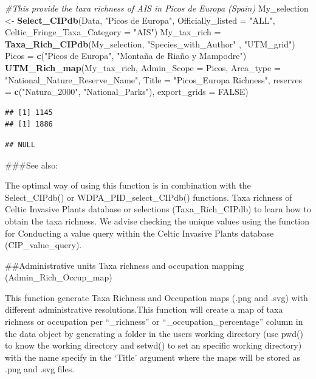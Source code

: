 \documentclass[
]{article}
\newenvironment{Shaded}{\begin{snugshade}}{\end{snugshade}}
\newcommand{\AttributeTok}[1]{\textcolor[rgb]{0.13,0.29,0.53}{#1}}
\newcommand{\CommentTok}[1]{\textcolor[rgb]{0.56,0.35,0.01}{\textit{#1}}}
\newcommand{\ConstantTok}[1]{\textcolor[rgb]{0.56,0.35,0.01}{#1}}
\newcommand{\FunctionTok}[1]{\textcolor[rgb]{0.13,0.29,0.53}{\textbf{#1}}}
\newcommand{\NormalTok}[1]{#1}
\newcommand{\OtherTok}[1]{\textcolor[rgb]{0.56,0.35,0.01}{#1}}
\newcommand{\StringTok}[1]{\textcolor[rgb]{0.31,0.60,0.02}{#1}}
\begin{document}
\begin{Shaded}
\begin{Highlighting}[]
\CommentTok{\#This provide the taxa richness of AIS in Picos de Europa (Spain)}
\NormalTok{My\_selection }\OtherTok{\textless{}{-}} \FunctionTok{Select\_CIPdb}\NormalTok{(Data, }\StringTok{"Picos de Europa"}\NormalTok{, }\AttributeTok{Officially\_listed =} \StringTok{"ALL"}\NormalTok{,}
\AttributeTok{Celtic\_Fringe\_Taxa\_Category =} \StringTok{"AIS"}\NormalTok{)}
\NormalTok{My\_tax\_rich }\OtherTok{=} \FunctionTok{Taxa\_Rich\_CIPdb}\NormalTok{(My\_selection, }\StringTok{"Species\_with\_Author"}\NormalTok{ , }\StringTok{"UTM\_grid"}\NormalTok{)}
\NormalTok{Picos }\OtherTok{=} \FunctionTok{c}\NormalTok{(}\StringTok{"Picos de Europa"}\NormalTok{, }\StringTok{"Montaña de Riaño y Mampodre"}\NormalTok{)}
\FunctionTok{UTM\_Rich\_map}\NormalTok{(My\_tax\_rich, }\AttributeTok{Admin\_Scope =}\NormalTok{ Picos, }\AttributeTok{Area\_type =} \StringTok{"National\_Nature\_Reserve\_Name"}\NormalTok{, }\AttributeTok{Title =} \StringTok{"Picos\_Europa Richness"}\NormalTok{, }\AttributeTok{reserves =} \FunctionTok{c}\NormalTok{(}\StringTok{"Natura\_2000"}\NormalTok{, }\StringTok{"National\_Parks"}\NormalTok{),  }\AttributeTok{export\_grids =} \ConstantTok{FALSE}\NormalTok{)}
\end{Highlighting}
\end{Shaded}

\begin{verbatim}
## [1] 1145
## [1] 1886
\end{verbatim}

\begin{verbatim}
## NULL
\end{verbatim}

\#\#\#See also:

The optimal way of using this function is in combination with the
Select\_CIPdb() or WDPA\_PID\_select\_CIPdb() functions. Taxa richness
of Celtic Invasive Plants database or selections (Taxa\_Rich\_CIPdb) to
learn how to obtain the taxa richness. We advise checking the unique
values using the function for Conducting a value query within the Celtic
Invasive Plants database (CIP\_value\_query).

\#\#Administrative units Taxa richness and occupation mapping
(Admin\_Rich\_Occup\_map)

This function generate Taxa Richness and Occupation maps (.png and .svg)
with different administrative resolutions.This function will create a
map of taxa richness or occupation per ``\_richness'' or
``\_occupation\_percentage'' column in the data object by generating a
folder in the users working directory (use pwd() to know the working
directory and setwd() to set an specific working directory) with the
name specify in the `Title' argument where the maps will be stored as
.png and .svg files.
\end{document}
